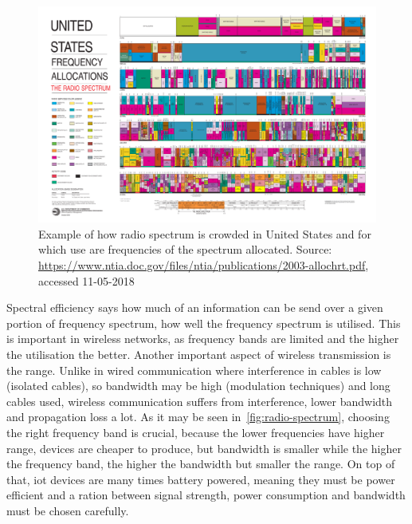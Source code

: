 \begin{figure}[ht]
    \centering
    \includegraphics[width=\textwidth]{00images/freq-alloc}
    \caption{Example of how radio spectrum is crowded in United States and for which use are frequencies of the spectrum allocated. Source: \url{https://www.ntia.doc.gov/files/ntia/publications/2003-allochrt.pdf}, accessed 11-05-2018}
    \label{fig:freq-alloc}
\end{figure}

Spectral efficiency says how much of an information can be send over a given portion of frequency spectrum, how well the frequency spectrum is utilised. This is important in wireless networks, as frequency bands are limited and the higher the utilisation the better. Another important aspect of wireless transmission is the range. Unlike in wired communication where interference in cables is low (isolated cables), so bandwidth may be high (modulation techniques) and long cables used, wireless communication suffers from interference, lower bandwidth and propagation loss a lot. As it may be seen in~\ref{fig:radio-spectrum}, choosing the right frequency band is crucial, because the lower frequencies have higher range, devices are cheaper to produce, but bandwidth is smaller while the higher the frequency band, the higher the bandwidth but smaller the range. On top of that, \acrshort{iot} devices are many times battery powered, meaning they must be power efficient and a ration between signal strength, power consumption and bandwidth must be chosen carefully.

